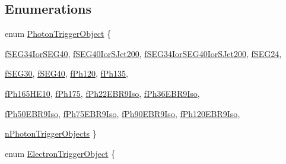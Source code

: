 \subsection*{Enumerations}
\begin{DoxyCompactItemize}
\item 
enum \hyperlink{namespacepanda_a5ce140b8bd3e92c52f43ba4266a9303c}{PhotonTriggerObject} \{ \par
\hyperlink{namespacepanda_a5ce140b8bd3e92c52f43ba4266a9303ca909c9fc687b7830d7bbec01b8ffa91c5}{fSEG34IorSEG40}, 
\hyperlink{namespacepanda_a5ce140b8bd3e92c52f43ba4266a9303ca1713685f571669d5e8d4cf0a0a748747}{fSEG40IorSJet200}, 
\hyperlink{namespacepanda_a5ce140b8bd3e92c52f43ba4266a9303cac1bc251cfe74ea48674bf81119f8011e}{fSEG34IorSEG40IorSJet200}, 
\hyperlink{namespacepanda_a5ce140b8bd3e92c52f43ba4266a9303ca7fdce728e752b0b2639671a5b8616d0a}{fSEG24}, 
\par
\hyperlink{namespacepanda_a5ce140b8bd3e92c52f43ba4266a9303ca4ac0fd2b55a9f43f280e3e2527bc9ceb}{fSEG30}, 
\hyperlink{namespacepanda_a5ce140b8bd3e92c52f43ba4266a9303ca8e08fc499f922cdd5a37419ba6eeb240}{fSEG40}, 
\hyperlink{namespacepanda_a5ce140b8bd3e92c52f43ba4266a9303caab955fcff4d57802b2b2d042f77a30bb}{fPh120}, 
\hyperlink{namespacepanda_a5ce140b8bd3e92c52f43ba4266a9303ca88e2fbd40fd2eb022412d1333d022dce}{fPh135}, 
\par
\hyperlink{namespacepanda_a5ce140b8bd3e92c52f43ba4266a9303cab17d2bb9b8f1881d0acfbb0b6932789c}{fPh165HE10}, 
\hyperlink{namespacepanda_a5ce140b8bd3e92c52f43ba4266a9303ca3a51cc9830538bd04650f86b7e8f7638}{fPh175}, 
\hyperlink{namespacepanda_a5ce140b8bd3e92c52f43ba4266a9303ca828891d5b6adc74069ecdab9023886ad}{fPh22EBR9Iso}, 
\hyperlink{namespacepanda_a5ce140b8bd3e92c52f43ba4266a9303caeb7d02a91dd368e2fd11e027764a94c7}{fPh36EBR9Iso}, 
\par
\hyperlink{namespacepanda_a5ce140b8bd3e92c52f43ba4266a9303ca1e19145eff22cf78fd22c044c385fb9e}{fPh50EBR9Iso}, 
\hyperlink{namespacepanda_a5ce140b8bd3e92c52f43ba4266a9303ca1654d5c75efd3903ce61c5af7b578110}{fPh75EBR9Iso}, 
\hyperlink{namespacepanda_a5ce140b8bd3e92c52f43ba4266a9303cacd0a418aee8c68b4c39379af227a9268}{fPh90EBR9Iso}, 
\hyperlink{namespacepanda_a5ce140b8bd3e92c52f43ba4266a9303ca2330a55736de248723cd9f185ccf2d52}{fPh120EBR9Iso}, 
\par
\hyperlink{namespacepanda_a5ce140b8bd3e92c52f43ba4266a9303ca70e606a33d75fe506136c13d5af69603}{nPhotonTriggerObjects}
 \}
\item 
enum \hyperlink{namespacepanda_a6ecb531d2b3885c0cd24596bc809ed84}{ElectronTriggerObject} \{ \par

\end{DoxyCompactItemize}
